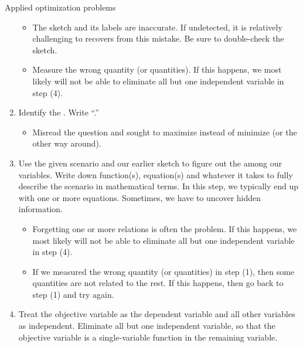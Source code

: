 \documentclass[../main.tex]{subfiles}
\begin{document}
\begin{lesson}{Applied optimization problems}
\begin{enumerate}[label=(\arabic*)]
      \begin{itemize}
        \item The sketch and its labels are inaccurate. If undetected, it is relatively challenging to recovers from this mistake. Be sure to double-check the sketch.
        \item Measure the wrong quantity (or quantities). If this happens, we most likely will not be able to eliminate all but one independent variable in step (4).
      \end{itemize}

    \item Identify the . Write ``\emph{}.''

      \begin{itemize}
        \item Misread the question and sought to maximize instead of minimize (or the other way around). 
      \end{itemize}


    \item Use the given scenario and our earlier sketch to figure out the  among our variables. Write down function(s), equation(s) and whatever it takes to fully describe the scenario in mathematical terms. In this step, we typically end up with one or more equations. Sometimes, we have to uncover hidden information.

      \begin{itemize}
        \item Forgetting one or more relations is often the problem. If this happens, we most likely will not be able to eliminate all but one independent variable in step (4).
        \item If we measured the wrong quantity (or quantities) in step (1), then some quantities are not related to the rest. If this happens, then go back to step (1) and try again.
      \end{itemize}

    \item Treat the objective variable as the dependent variable and all other variables as independent. Eliminate all but one independent variable, so that the objective variable is a single-variable function in the remaining variable.


\end{enumerate}
\end{lesson}
\end{document}

